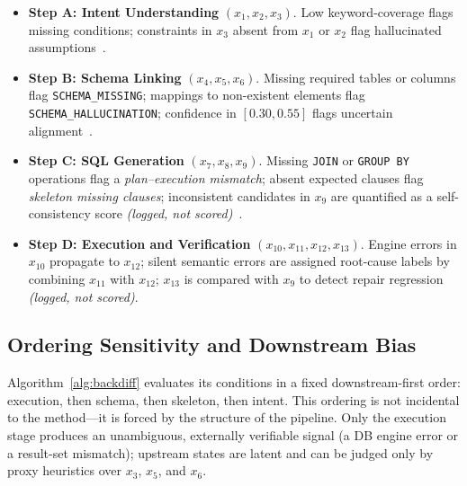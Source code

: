 \documentclass[conference]{IEEEtran}
\begin{document}
\begin{itemize}
  \item \textbf{Step A: Intent Understanding} $(x_1, x_2, x_3)$. Low keyword-coverage flags missing conditions; constraints in $x_3$ absent from $x_1$ or $x_2$ flag hallucinated assumptions~\cite{ding_ambisql_2025}.
  \item \textbf{Step B: Schema Linking} $(x_4, x_5, x_6)$. Missing required tables or columns flag \texttt{SCHEMA\_MISSING}; mappings to non-existent elements flag \texttt{SCHEMA\_HALLUCINATION}; confidence in $[0.30, 0.55]$ flags uncertain alignment~\cite{yang_sql_to_schema_2024, zhu_scot2s_2025}.
  \item \textbf{Step C: SQL Generation} $(x_7, x_8, x_9)$. Missing \texttt{JOIN} or \texttt{GROUP BY} operations flag a \emph{plan--execution mismatch}; absent expected clauses flag \emph{skeleton missing clauses}; inconsistent candidates in $x_9$ are quantified as a self-consistency score \emph{(logged, not scored)}~\cite{zhu_scot2s_2025, lei_emlc_2026}.
  \item \textbf{Step D: Execution and Verification} $(x_{10}, x_{11}, x_{12}, x_{13})$. Engine errors in $x_{10}$ propagate to $x_{12}$; silent semantic errors are assigned root-cause labels by combining $x_{11}$ with $x_{12}$; $x_{13}$ is compared with $x_9$ to detect repair regression \emph{(logged, not scored)}.
\end{itemize}

\subsection{Ordering Sensitivity and Downstream Bias}
\label{sec:bias_design}

Algorithm~\ref{alg:backdiff} evaluates its conditions in a fixed
downstream-first order: execution, then schema, then skeleton, then intent.
This ordering is not incidental to the method---it is forced by the structure
of the pipeline. Only the execution stage produces an unambiguous, externally
verifiable signal (a DB engine error or a result-set mismatch); upstream
states are latent and can be judged only by proxy heuristics over $x_3$,
$x_5$, and $x_6$.
\end{document}
